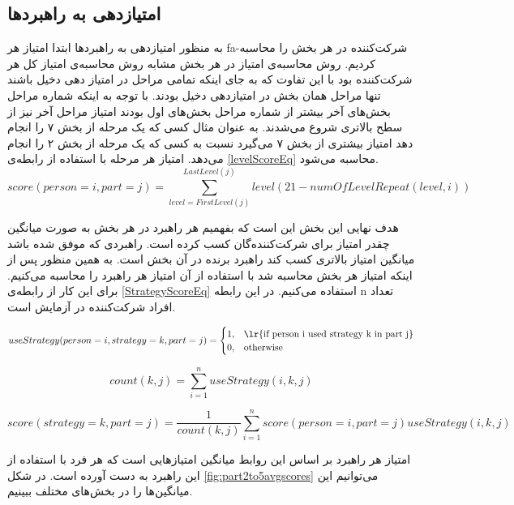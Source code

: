 \documentclass[twoside, a4paper,11pt]{book}
\numberwithin{equation}{chapter}
\numberwithin{table}{chapter}
\numberwithin{figure}{chapter}
\numberwithin{equation}{chapter}
\newcommand{\mls}[1]{\gls{fa-#1}\glsuseri{la-#1}}
\begin{document}
\subsection{امتیازدهی به راهبرد‌ها}
به منظور امتیازدهی به راهبرد‌ها ابتدا امتیاز هر  \mls{شرکت‌کننده} در هر بخش را محاسبه کردیم. روش محاسبه‌ی امتیاز در هر بخش مشابه روش محاسبه‌ی امتیاز کل هر شرکت‌کننده بود با این تفاوت که به جای اینکه تمامی مراحل در امتیاز دهی دخیل باشند تنها مراحل همان بخش در امتیازدهی دخیل بودند. با توجه به اینکه شماره مراحل بخش‌های آخر بیشتر از شماره مراحل بخش‌های اول بودند امتیاز مراحل آخر نیز از سطح بالاتری شروع می‌شدند. به عنوان مثال کسی که یک مرحله از بخش ۷ را انجام دهد امتیاز بیشتری از بخش ۷ می‌گیرد نسبت به کسی که یک مرحله از بخش ۲ را انجام می‌دهد. امتیاز هر مرحله با استفاده از رابطه‌ی \ref{levelScoreEq} محاسبه می‌شود.
\begin{equation}
\label{levelScoreEq}
	score(person = i, part = j) = \sum_{level = FirstLevel(j)}^{LastLevel(j)} level(21-numOfLevelRepeat(level, i))
\end{equation}

هدف نهایی این بخش این است که بفهمیم هر راهبرد در هر بخش به صورت میانگین چقدر امتیاز برای شرکت‌کننده‌گان کسب کرده است. راهبرد‌ی که موفق شده باشد میانگین امتیاز بالاتری کسب کند راهبرد برنده در آن بخش است. به همین منظور پس از اینکه امتیاز هر بخش محاسبه شد با استفاده از آن امتیاز هر راهبرد را محاسبه می‌کنیم. برای این کار از رابطه‌ی \ref{StrategyScoreEq} استفاده می‌کنیم. در این رابطه n  تعداد افراد شرکت‌کننده در آزمایش است. 

\begin{equation}
\label{UseStrategyEq}
useStrategy(person = i, strategy = k, part = j) =\begin{cases}
    1 ,& \text{\lr{if person i used strategy k in part j}} \\
    0 , & \text{otherwise}
    \end{cases}
\end{equation}


\begin{equation}
count(k, j) = \sum_{i=1}^{n} useStrategy(i, k, j)
\end{equation}

\begin{equation}
\label{StrategyScoreEq}
	score(strategy = k, part = j) = \frac{1}{count(k, j)} \sum_{i=1}^{n} score(person = i, part = j) useStrategy(i, k, j)
\end{equation}


امتیاز هر راهبرد بر اساس این روابط میانگین امتیازهایی است که هر فرد با استفاده از این راهبرد به دست آورده است. در شکل   \ref{fig:part2to5avgscores} می‌توانیم این میانگین‌ها را در بخش‌های مختلف ببینیم.
\end{document}
